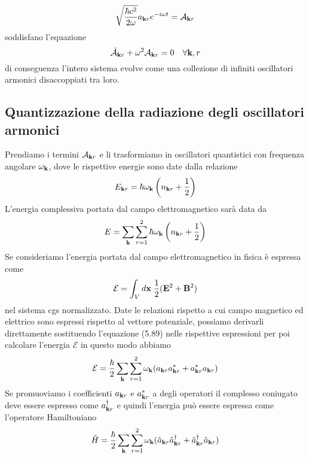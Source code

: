 \begin{equation*}
	\sqrt{\frac{\hbar c^2}{2 \omega}}a_{\bold{k}r}e^{-i\omega t} = \mathcal{A}_{\bold{k}r}
\end{equation*}
soddisfano l'equazione 
\begin{equation*}
	\ddot{\mathcal{A}}_{\bold{k}r}+\omega^2 \mathcal{A}_{\bold{k}r} = 0 \quad \forall \bold{k},r
\end{equation*}
di conseguenza l'intero sistema evolve come una collezione di infiniti oscillatori armonici disaccoppiati tra loro.

\subsection{Quantizzazione della radiazione degli oscillatori armonici}

Prendiamo i termini $\mathcal{A}_{\bold{k}r}$ e li trasformiamo in oscillatori quantistici con frequenza angolare $\omega_{\bold{k}}$, dove le rispettive energie sono date dalla relazione
\begin{equation*}
	E_{\bold{k}r} = \hbar \omega_{\bold{k}}\left (n_{\bold{k}r} + \frac{1}{2}\right )
\end{equation*}
L'energia complessiva portata dal campo elettromagnetico sar\`a data da 
\begin{equation*}
	E = \sum_{\bold{k}}\sum_{r =1}^2 \hbar \omega_{\bold{k}}\left(n_{\bold{k}r}+\frac{1}{2}\right)
\end{equation*}
Se consideriamo l'energia portata dal campo elettromagnetico in fisica \`e espressa come
\begin{equation*}
	\mathcal{E} = \int_{V} d \bold{x} \; \frac{1}{2}(\bold{E}^2+\bold{B}^2)
\end{equation*}
nel sistema cgs normalizzato. Date le relazioni rispetto a cui campo magnetico ed elettrico sono espressi rispetto al vettore potenziale, possiamo derivarli direttamente sostituendo l'equazione (5.89) nelle rispettive espressioni per poi calcolare l'energia $\mathcal{E}$ in questo modo abbiamo 
\begin{equation*}
	\mathcal{E} = \frac{\hbar}{2}\sum_{\bold{k}}\sum_{r=1}^2 \omega_{\bold{k}}(a_{\bold{k}r}a^*_{\bold{k}r} + a_{\bold{k}r}^*a_{\bold{k}r})
\end{equation*} 
Se promuoviamo i coefficienti $a_{\bold{k}r}$ e $a_{\bold{k}r}^*$ a degli operatori il complesso coniugato deve essere espresso come $a_{\bold{k}r}^{\dag}$ e quindi l'energia pu\`o essere espressa come l'operatore Hamiltoniano
\begin{equation*}
	\hat{H} = \frac{\hbar}{2}\sum_{\bold{k}} \sum_{r=1}^2 \omega_{\bold{k}}(\hat{a}_{\bold{k}r}\hat{a}_{\bold{k}r}^{\dag} + \hat{a}_{\bold{k}r}^{\dag}\hat{a}_{\bold{k}r})
\end{equation*}
